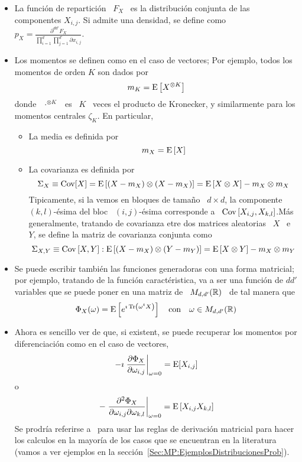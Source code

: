 \begin{itemize}
\item La funci\'on  de repartici\'on \ $F_X$ \ es  la distribuci\'on conjunta de
  las  componentes  $X_{i,j}$.   Si  admite  una  densidad,  se  define  como  \
  $\displaystyle      p_X       =      \frac{\partial^{d      d'} F_X}{\prod_{i=1}^d
    \prod_{j=1}^{d'} \partial x_{i,j}}$.
%
\item Los  momentos se definen como en  el caso de vectores;  Por ejemplo, todos
  los momentos de orden $K$ son dados por
  \[
  m_K = \operatorname{E}\left[ X^{\otimes K} \right]
  \]
  donde \  $\cdot^{\otimes K}$ \ es  \ $K$ \  veces el producto de  Kronecker, y
  similarmente para los momentos centrales $\zeta_K$. En particular,
  \begin{itemize}
  \item La media es definida por
    \[
    m_X = \operatorname{E}\left[ X \right]
    \]
  \item  La covarianza  es  definida por
    \[
    \Sigma_X  \equiv \operatorname{Cov}[X]  =  \operatorname{E}\left[ (X-m_X)  \otimes  (X-m_X) \right]  =
    \operatorname{E}\left[ X \otimes X \right] - m_X \otimes m_X
    \]
    Tipicamente,  si  la  vemos en  bloques  de  tama\~no  \  $d \times  d$,  la
    componente  \ $(k,l)$-\'esima  del bloc  \ $(i,j)$-\'esima  corresponde  a \
    $\operatorname{Cov}\left[ X_{i,j} , X_{k,l} \right]$.\newline M\'as generalmente, tratando
    de covarianza  etre dos matrices aleatorias  \ $X$ \  e \ $Y$, se  define la
    matriz de covarianza conjunta como
    \[
    \Sigma_{X,Y} \equiv  \operatorname{Cov}\left[ X ,  Y \right] : \operatorname{E}\left[  (X-m_X) \otimes
      (Y-m_Y) \right] = \operatorname{E}\left[ X \otimes Y \right] - m_X \otimes m_Y
    \]
  \end{itemize}
%
\item  Se puede  escribir  tambi\'en  las funciones  generadoras  con una  forma
  matricial; por  ejemplo, tratando de  la funci\'on caract\'eristica, va  a ser
  una  funci\'on de  $d d'$  variables que  se puede  poner en  una matriz  de \
  $M_{d,d'}(\mathbb{R})$ \ de tal manera que
  \[
  \Phi_X(\omega) =  \operatorname{E}\left[ e^{\imath  \operatorname{Tr}\left( \omega^t X  \right)} \right]
  \quad \mbox{con} \quad \omega \in M_{d,d'}(\mathbb{R})
  \]
%
\item Ahora es sencillo ver de que, si existent, se puede recuperar los momentos
  por  diferenciaci\'on   como  en  el  caso  de   vectores,
  \[
  -\imath \left. \frac{\partial \Phi_X}{\partial \omega_{i,j}} \right|_{\omega =
    0} = \operatorname{E}[X_{i,j}]
  \]
  o
  \[
  - \left. \frac{\partial^2 \Phi_X}{\partial \omega_{i,j} \partial \omega_{k,l}}
  \right|_{\omega = 0} = \operatorname{E}\left[ X_{i,j} X_{k,l} \right]
  \]
  Se  prodr\'ia  referirse a~\cite[Cap.~8]{MagNeu99}  para  usar  las reglas  de
  derivaci\'on matricial  para hacer los calculos  en la mayor\'ia  de los casos
  que   se  encuentran  en   la  literatura   (vamos  a   ver  ejemplos   en  la
  secci\'on~\ref{Sec:MP:EjemplosDistribucionesProb}).
\end{itemize}



